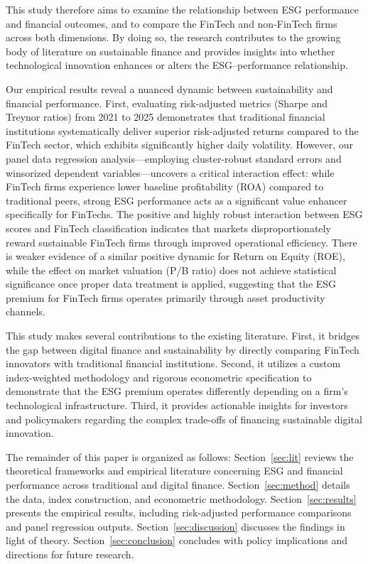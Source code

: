 \documentclass[12pt]{article}
\begin{document}
This study therefore aims to examine the relationship between ESG performance and financial outcomes, and to compare the FinTech and non-FinTech firms across both dimensions. By doing so, the research contributes to the growing body of literature on sustainable finance and provides insights into whether technological innovation enhances or alters the ESG--performance relationship.

Our empirical results reveal a nuanced dynamic between sustainability and financial performance. First, evaluating risk-adjusted metrics (Sharpe and Treynor ratios) from 2021 to 2025 demonstrates that traditional financial institutions systematically deliver superior risk-adjusted returns compared to the FinTech sector, which exhibits significantly higher daily volatility. However, our panel data regression analysis---employing cluster-robust standard errors and winsorized dependent variables---uncovers a critical interaction effect: while FinTech firms experience lower baseline profitability (ROA) compared to traditional peers, strong ESG performance acts as a significant value enhancer specifically for FinTechs. The positive and highly robust interaction between ESG scores and FinTech classification indicates that markets disproportionately reward sustainable FinTech firms through improved operational efficiency. There is weaker evidence of a similar positive dynamic for Return on Equity (ROE), while the effect on market valuation (P/B ratio) does not achieve statistical significance once proper data treatment is applied, suggesting that the ESG premium for FinTech firms operates primarily through asset productivity channels.

This study makes several contributions to the existing literature. First, it bridges the gap between digital finance and sustainability by directly comparing FinTech innovators with traditional financial institutions. Second, it utilizes a custom index-weighted methodology and rigorous econometric specification to demonstrate that the ESG premium operates differently depending on a firm's technological infrastructure. Third, it provides actionable insights for investors and policymakers regarding the complex trade-offs of financing sustainable digital innovation.

The remainder of this paper is organized as follows: Section~\ref{sec:lit} reviews the theoretical frameworks and empirical literature concerning ESG and financial performance across traditional and digital finance. Section~\ref{sec:method} details the data, index construction, and econometric methodology. Section~\ref{sec:results} presents the empirical results, including risk-adjusted performance comparisons and panel regression outputs. Section~\ref{sec:discussion} discusses the findings in light of theory. Section~\ref{sec:conclusion} concludes with policy implications and directions for future research.
\end{document}
